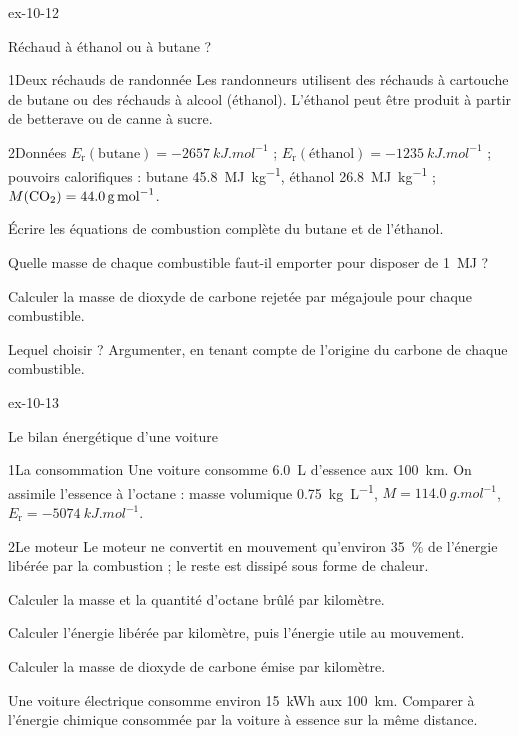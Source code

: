 \begin{blocLivre}{ex-10-12}
\begin{exercice}[3]{Réchaud à éthanol ou à butane ?}
\begin{docu}{1}{Deux réchauds de randonnée}
Les randonneurs utilisent des réchauds à cartouche de butane ou des réchauds à alcool (éthanol). L'éthanol peut être
produit à partir de betterave ou de canne à sucre.
\end{docu}
\begin{docu}{2}{Données}
$E_\mathrm{r}(\text{butane})=\qty{-2657}{kJ.mol^{-1}}$ ; $E_\mathrm{r}(\text{éthanol})=\qty{-1235}{kJ.mol^{-1}}$ ; pouvoirs calorifiques : butane \qty{45,8}{MJ.kg^{-1}}, éthanol
\qty{26,8}{MJ.kg^{-1}} ; $M(\ce{CO2})=\qty{44,0}{g.mol^{-1}}$.
\end{docu}
\begin{questions}
\item Écrire les équations de combustion complète du butane et de l'éthanol.
\item Quelle masse de chaque combustible faut-il emporter pour disposer de \qty{1}{MJ} ?
\item Calculer la masse de dioxyde de carbone rejetée par mégajoule pour chaque combustible.
\item \initiative Lequel choisir ? Argumenter, en tenant compte de l'origine du carbone de chaque combustible.
\end{questions}
\end{exercice}
\end{blocLivre}
\begin{blocLivre}{ex-10-13}
\begin{exercice}[3]{Le bilan énergétique d'une voiture}
\begin{docu}{1}{La consommation}
Une voiture consomme \qty{6,0}{L} d'essence aux \qty{100}{km}. On assimile l'essence à l'octane : masse volumique \qty{0,75}{kg.L^{-1}},
$M=\qty{114,0}{g.mol^{-1}}$, $E_\mathrm{r}=\qty{-5074}{kJ.mol^{-1}}$.
\end{docu}
\begin{docu}{2}{Le moteur}
Le moteur ne convertit en mouvement qu'environ \qty{35}{\percent} de l'énergie libérée par la combustion ; le reste est dissipé sous
forme de chaleur.
\end{docu}
\begin{questions}
\item Calculer la masse et la quantité d'octane brûlé par kilomètre.
\item Calculer l'énergie libérée par kilomètre, puis l'énergie utile au mouvement.
\item Calculer la masse de dioxyde de carbone émise par kilomètre.
\item \initiative Une voiture électrique consomme environ \qty{15}{kWh} aux \qty{100}{km}. Comparer à l'énergie chimique consommée par la
voiture à essence sur la même distance.
\end{questions}
\end{exercice}
\end{blocLivre}

